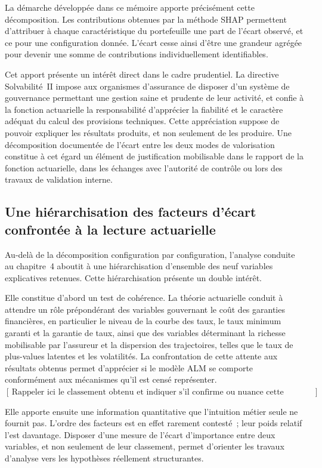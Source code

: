 La démarche développée dans ce mémoire apporte précisément cette décomposition. Les contributions obtenues par la méthode SHAP permettent d'attribuer à chaque caractéristique du portefeuille une part de l'écart observé, et ce pour une configuration donnée. L'écart cesse ainsi d'être une grandeur agrégée pour devenir une somme de contributions individuellement identifiables.

Cet apport présente un intérêt direct dans le cadre prudentiel. La directive Solvabilité~II impose aux organismes d'assurance de disposer d'un système de gouvernance permettant une gestion saine et prudente de leur activité, et confie à la fonction actuarielle la responsabilité d'apprécier la fiabilité et le caractère adéquat du calcul des provisions techniques. Cette appréciation suppose de pouvoir expliquer les résultats produits, et non seulement de les produire. Une décomposition documentée de l'écart entre les deux modes de valorisation constitue à cet égard un élément de justification mobilisable dans le rapport de la fonction actuarielle, dans les échanges avec l'autorité de contrôle ou lors des travaux de validation interne.

\subsection{Une hiérarchisation des facteurs d'écart confrontée à la lecture actuarielle}

Au-delà de la décomposition configuration par configuration, l'analyse conduite au chapitre~4 aboutit à une hiérarchisation d'ensemble des neuf variables explicatives retenues. Cette hiérarchisation présente un double intérêt.

Elle constitue d'abord un test de cohérence. La théorie actuarielle conduit à attendre un rôle prépondérant des variables gouvernant le coût des garanties financières, en particulier le niveau de la courbe des taux, le taux minimum garanti et la garantie de taux, ainsi que des variables déterminant la richesse mobilisable par l'assureur et la dispersion des trajectoires, telles que le taux de plus-values latentes et les volatilités. La confrontation de cette attente aux résultats obtenus permet d'apprécier si le modèle ALM se comporte conformément aux mécanismes qu'il est censé représenter. \([\,\text{Rappeler ici le classement obtenu et indiquer s'il confirme ou nuance cette lecture.}\,]\)

Elle apporte ensuite une information quantitative que l'intuition métier seule ne fournit pas. L'ordre des facteurs est en effet rarement contesté~; leur poids relatif l'est davantage. Disposer d'une mesure de l'écart d'importance entre deux variables, et non seulement de leur classement, permet d'orienter les travaux d'analyse vers les hypothèses réellement structurantes.

